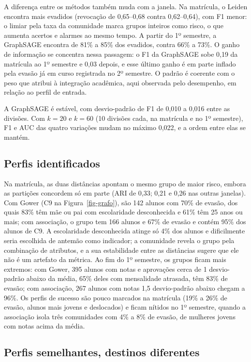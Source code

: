 A diferença entre os métodos também muda com a janela. Na matrícula, o Leiden encontra mais evadidos (revocação de 0,65--0,68 contra 0,62--0,64), com F1 menor: o limiar pela taxa da comunidade marca grupos inteiros como risco, o que aumenta acertos e alarmes ao mesmo tempo. A partir do 1º semestre, a GraphSAGE encontra de 81\% a 85\% dos evadidos, contra 66\% a 73\%. O ganho de informação se concentra nessa passagem: o F1 da GraphSAGE sobe 0,19 da matrícula ao 1º semestre e 0,03 depois, e esse último ganho é em parte inflado pela evasão já em curso registrada no 2º semestre. O padrão é coerente com o peso que \cite{tinto1975} atribui à integração acadêmica, aqui observada pelo desempenho, em relação ao perfil de entrada.

A GraphSAGE é estável, com desvio-padrão de F1 de 0,010 a 0,016 entre as divisões. Com $k = 20$ e $k = 60$ (10 divisões cada, na matrícula e no 1º semestre), F1 e AUC das quatro variações mudam no máximo 0,022, e a ordem entre elas se mantém.\label{ssec:robustez}

\subsection{Perfis identificados}

Na matrícula, as duas distâncias apontam o mesmo grupo de maior risco, embora as partições concordem só em parte (ARI de 0,33; 0,21 e 0,26 nas outras janelas). Com Gower (C9 na Figura~\ref{fig-grafo}), são 142 alunos com 70\% de evasão, dos quais 83\% têm mãe ou pai com escolaridade desconhecida e 61\% têm 25 anos ou mais; com associação, o grupo tem 166 alunos e 67\% de evasão e contém 95\% dos alunos de C9. A escolaridade desconhecida atinge só 4\% dos alunos e dificilmente seria escolhida de antemão como indicador; a comunidade revela o grupo pela combinação de atributos, e a sua estabilidade entre as distâncias sugere que ele não é um artefato da métrica. Ao fim do 1º semestre, os grupos ficam mais extremos: com Gower, 395 alunos com notas e aprovações cerca de 1 desvio-padrão abaixo da média, 65\% deles com mensalidade atrasada, têm 83\% de evasão; com associação, 267 alunos com notas 1,5 desvio-padrão abaixo chegam a 96\%. Os perfis de sucesso são pouco marcados na matrícula (19\% a 26\% de evasão, alunos mais jovens e deslocados) e ficam nítidos no 1º semestre, quando a associação isola três comunidades com 4\% a 8\% de evasão, de mulheres jovens com notas acima da média.

\subsection{Perfis semelhantes, destinos diferentes}


